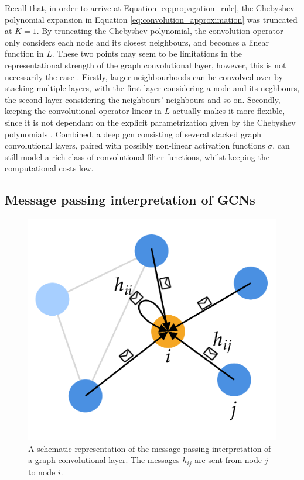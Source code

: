 Recall that, in order to arrive at Equation \eqref{eq:propagation_rule}, the Chebyshev polynomial expansion in Equation \eqref{eq:convolution_approximation} was truncated at $K=1$. By truncating the Chebyshev polynomial, the convolution operator only considers each node and its closest neighbours, and becomes a linear function in $L$. These two points may seem to be limitations in the representational strength of the graph convolutional layer, however, this is not necessarily the case \cite{kipf_semi_supervised}. Firstly, larger neighbourhoods can be convolved over by stacking multiple layers, with the first layer considering a node and its neghbours, the second layer considering the neighbours' neighbours and so on. Secondly, keeping the convolutional operator linear in $L$ actually makes it more flexible, since it is not dependant on the explicit parametrization given by the Chebyshev polynomials \cite{kipf_semi_supervised}. Combined, a deep \acrshort{gcn} consisting of several stacked graph convolutional layers, paired with possibly non-linear activation functions $\sigma$, can still model a rich class of convolutional filter functions, whilst keeping the computational costs low. 


\subsection{Message passing interpretation of GCNs}
\label{subsec:message_passing}

\begin{figure}[!htbp]
    \centering
    \includegraphics[width=0.5\linewidth]{chapters/images_theory/message_passing_v2.png}
    \caption{A schematic representation of the message passing interpretation of a graph convolutional layer. The messages $h_{ij}$ are sent from node $j$ to node $i$.}
    \label{fig:message_passing}
\end{figure}


